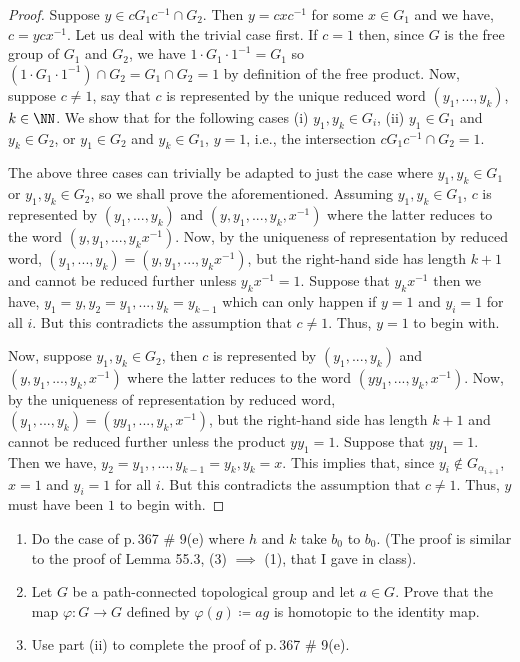 \begin{proof}
Suppose $y\in cG_1c^{-1}\cap G_2$. Then $y=cxc^{-1}$ for some $x\in
G_1$ and we have, $c=ycx^{-1}$. Let us deal with the trivial case first. If
$c=1$ then, since $G$ is the free group of $G_1$ and $G_2$, we have $1\cdot
G_1\cdot 1^{-1}=G_1$ so $(1\cdot G_1\cdot 1^{-1})\cap G_2=G_1\cap G_2=1$ by
definition of the free product. Now, suppose $c\neq 1$, say that $c$ is
represented by the unique reduced word $(y_1,...,y_k)$, $k\in\NN$. We show
that for the following cases (i) $y_1,y_k\in G_i$, (ii) $y_1\in G_1$ and
$y_k\in G_2$, or $y_1\in G_2$ and $y_k\in G_1$, $y=1$, i.e., the
intersection $cG_1c^{-1}\cap G_2=1$.

The above three cases can trivially be adapted to just the case where
$y_1,y_k\in G_1$ or $y_1,y_k\in G_2$, so we shall prove the
aforementioned. Assuming $y_1,y_k\in G_1$, $c$ is represented by
$(y_1,...,y_k)$ and $(y,y_1,...,y_k,x^{-1})$ where the latter reduces to
the word $(y,y_1,...,y_kx^{-1})$. Now, by the uniqueness of representation
by reduced word, $(y_1,...,y_k)=(y,y_1,...,y_kx^{-1})$, but the right-hand
side has length $k+1$ and cannot be reduced further unless
$y_kx^{-1}=1$. Suppose that $y_kx^{-1}$ then we have,
$y_1=y,y_2=y_1,...,y_k=y_{k-1}$ which can only happen if $y=1$ and $y_i=1$
for all $i$. But this contradicts the assumption that $c\neq 1$. Thus,
$y=1$ to begin with.

Now, suppose $y_1,y_k\in G_2$, then $c$ is represented by $(y_1,...,y_k)$
and $(y,y_1,...,y_k,x^{-1})$ where the latter reduces to  the word
$(yy_1,...,y_k,x^{-1})$. Now, by the uniqueness of representation by
reduced word, $(y_1,...,y_k)=(yy_1,...,y_k,x^{-1})$, but the right-hand
side has length $k+1$ and cannot be reduced further unless the product
$yy_1=1$. Suppose that $yy_1=1$. Then we have,
$y_2=y_1,,...,y_{k-1}=y_k,y_k=x$. This implies that, since $y_i\notin
G_{\alpha_{i+1}}$, $x=1$ and $y_i=1$ for all $i$. But this contradicts the
assumption that $c\neq 1$. Thus, $y$ must have been $1$ to begin with.
\end{proof}
\newpage
\begin{problem}[A]
\begin{enumerate}[label=(\roman*)]
\item Do the case of p.\,367 \# 9(e) where $h$ and $k$ take $b_0$ to
  $b_0$. (The proof is similar to the proof of Lemma 55.3, (3) $\implies$
  (1), that I gave in class).
\item Let $G$ be a path-connected topological group and let $a\in G$. Prove
  that the map $\varphi\colon G\to G$ defined by $\varphi(g)\coloneqq ag$
  is homotopic to the identity map.
\item Use part (ii) to complete the proof of p.\,367 \# 9(e).
\end{enumerate}
\end{problem}
